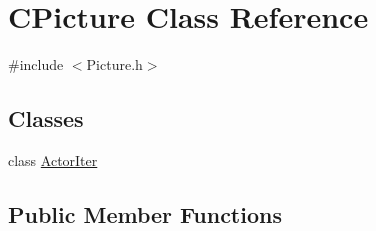 \hypertarget{class_c_picture}{}\section{C\+Picture Class Reference}
\label{class_c_picture}


{\ttfamily \#include $<$Picture.\+h$>$}

\subsection*{Classes}
\begin{DoxyCompactItemize}
\item 
class \hyperlink{class_c_picture_1_1_actor_iter}{Actor\+Iter}
\end{DoxyCompactItemize}
\subsection*{Public Member Functions}
